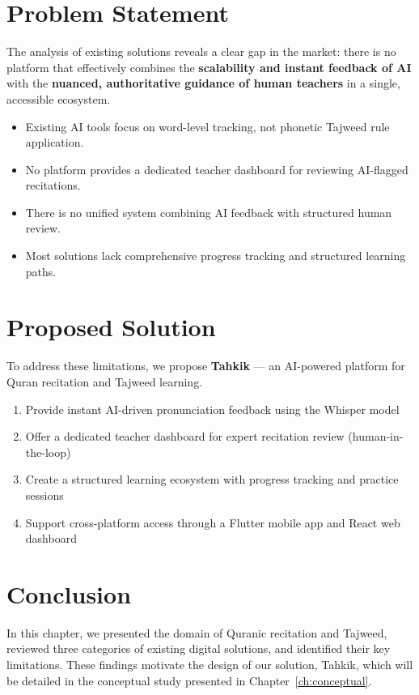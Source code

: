 \section{Problem Statement}
\label{sec:soa_problem}

The analysis of existing solutions reveals a clear gap in the market: there is no platform that effectively combines the \textbf{scalability and instant feedback of AI} with the \textbf{nuanced, authoritative guidance of human teachers} in a single, accessible ecosystem.

\begin{warnbox}[title=Identified Limitations]
\begin{itemize}
  \item Existing AI tools focus on word-level tracking, not phonetic Tajweed rule application.
  \item No platform provides a dedicated teacher dashboard for reviewing AI-flagged recitations.
  \item There is no unified system combining AI feedback with structured human review.
  \item Most solutions lack comprehensive progress tracking and structured learning paths.
\end{itemize}
\end{warnbox}

\section{Proposed Solution}
\label{sec:soa_solution}

To address these limitations, we propose \textbf{Tahkik} --- an AI-powered platform for Quran recitation and Tajweed learning.

\begin{emeraldbox}[title=Project Objectives]
\begin{enumerate}
  \item Provide instant AI-driven pronunciation feedback using the Whisper model
  \item Offer a dedicated teacher dashboard for expert recitation review (human-in-the-loop)
  \item Create a structured learning ecosystem with progress tracking and practice sessions
  \item Support cross-platform access through a Flutter mobile app and React web dashboard
\end{enumerate}
\end{emeraldbox}

\section{Conclusion}

In this chapter, we presented the domain of Quranic recitation and Tajweed, reviewed three categories of existing digital solutions, and identified their key limitations. These findings motivate the design of our solution, Tahkik, which will be detailed in the conceptual study presented in Chapter~\ref{ch:conceptual}.
